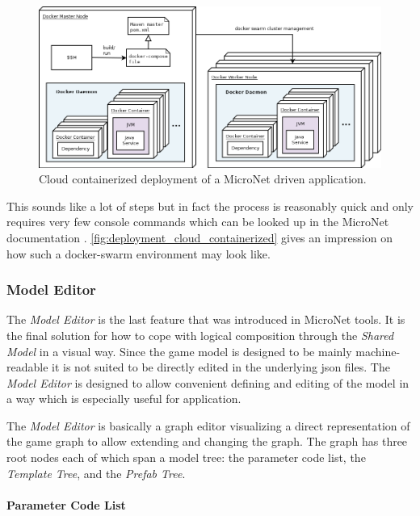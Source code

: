 \begin{figure}
	\hspace*{-0.8cm}
	\centering
	\includegraphics[width=1.1\textwidth]{images/architecture/DeploymentCloudContainerized}
	\caption{Cloud containerized deployment of a MicroNet driven application.}
	\label{fig:deployment_cloud_containerized}
\end{figure}

This sounds like a lot of steps but in fact the process is reasonably quick and
only requires very few console commands which can be looked up in the MicroNet
documentation \cite{micronet2017doku}.
\autoref{fig:deployment_cloud_containerized} gives an impression on how such a
docker-swarm environment may look like.

\subsubsection{Model Editor}

The \textit{Model Editor} is the last feature that was introduced in MicroNet
tools. It is the final solution for how to cope with logical \ms{} composition
through the \textit{Shared Model} in a visual way. Since the game model is
designed to be mainly machine-readable it is not suited to be directly edited in
the underlying \gls{json} files. The \textit{Model Editor} is designed to allow
convenient defining and editing of the model in a way which is especially useful
for \og{} application.

The \textit{Model Editor} is basically a graph editor visualizing a direct
representation of the game graph to allow extending and changing the graph. The
graph has three root nodes each of which span a model tree: the parameter code
list, the \textit{Template Tree}, and the \textit{Prefab Tree}.

\paragraph{Parameter Code List}

